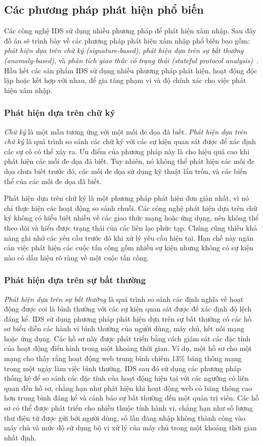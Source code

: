 \subsection{Các phương pháp phát hiện phổ biến}
Các công nghệ IDS sử dụng nhiều phương pháp để phát hiện xâm nhập. Sau đây đồ án sẽ trình bày về các phương pháp phát hiện xâm nhập phổ biến bao gồm: \emph{phát hiện dựa trên chữ ký (signature-based)}, \emph{phát hiện dựa trên sự bất thường (anomaly-based)}, và \emph{phân tích giao thức có trạng thái (stateful protocol analysis)}~\cite{scarfone2007guide}. Hầu hết các sản phẩm IDS sử dụng nhiều phương pháp phát hiện, hoạt động độc lập hoặc kết hợp với nhau, để gia tăng phạm vi và độ chính xác cho việc phát hiện xâm nhập.

\subsubsection{Phát hiện dựa trên chữ ký}
\emph{Chữ ký} là một mẫu tương ứng với một mối đe dọa đã biết. \emph{Phát hiện dựa trên chữ ký} là quá trình so sánh các chữ ký với các sự kiện quan sát được để xác định các sự cố có thể xảy ra. Ưu điểm của phương pháp này là cho hiệu quả cao khi phát hiện các mối đe dọa đã biết. Tuy nhiên, nó không thể phát hiện các mối đe dọa chưa biết trước đó, các mối đe dọa sử dụng kỹ thuật lẩn trốn, và các biến thể của các mối đe dọa đã biết.

Phát hiện dựa trên chữ ký là một phương pháp phát hiện đơn giản nhất, vì nó chỉ thực hiện các hoạt động so sánh chuỗi. Các công nghệ phát hiện dựa trên chữ ký không có hiểu biết nhiều về các giao thức mạng hoặc ứng dụng, nên không thể theo dõi và hiểu được trạng thái của các liên lạc phức tạp. Chúng cũng thiếu khả năng ghi nhớ các yêu cầu trước đó khi xử lý yêu cầu hiện tại. Hạn chế này ngăn cản việc phát hiện các cuộc tấn công gồm nhiều sự kiện nhưng không có sự kiện nào có dấu hiệu rõ ràng về một cuộc tấn công.

\subsubsection{Phát hiện dựa trên sự bất thường}
\emph{Phát hiện dựa trên sự bất thường} là quá trình so sánh các định nghĩa về hoạt động được coi là bình thường với các sự kiện quan sát được để xác định độ lệch đáng kể. IDS sử dụng phương pháp phát hiện dựa trên sự bất thường có các hồ sơ biểu diễn các hành vi bình thường của người dùng, máy chủ, kết nối mạng hoặc ứng dụng. Các hồ sơ này được phát triển bằng cách giám sát các đặc tính của hoạt động điển hình trong một khoảng thời gian. Ví dụ, một hồ sơ cho một mạng cho thấy rằng hoạt động web trung bình chiếm 13\% băng thông mạng trong một ngày làm việc bình thường. IDS sau đó sử dụng các phương pháp thống kê để so sánh các đặc tính của hoạt động hiện tại với các ngưỡng có liên quan đến hồ sơ, chẳng hạn như phát hiện khi hoạt động web có băng thông cao hơn trung bình đáng kể và cảnh báo sự bất thường đến một quản trị viên. Các hồ sơ có thể được phát triển cho nhiều thuộc tính hành vi, chẳng hạn như số lượng thư điện tử được gửi bởi người dùng, số lần đăng nhập không thành công vào máy chủ và mức độ sử dụng bộ vi xử lý của máy chủ trong một khoảng thời gian nhất định.

